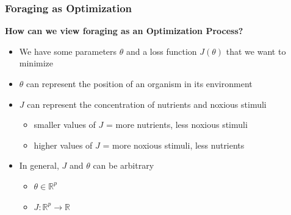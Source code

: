 \documentclass{beamer}
\begin{document}
\begin{frame}
\frametitle{Foraging as Optimization}
\textbf{How can we view foraging as an Optimization Process?}
\begin{itemize}
  \item<1-> We have some parameters $\theta$ and a loss function $J(\theta)$ that we want to minimize
  \item<2-> $\theta$ can represent the position of an organism in its environment
  \item<3-> $J$ can represent the concentration of nutrients and noxious stimuli
  \begin{itemize}
    \item smaller values of $J$ = more nutrients, less noxious stimuli
    \item higher values of $J$ = more noxious stimuli, less nutrients
  \end{itemize}
  \item<4-> In general, $J$ and $\theta$ can be arbitrary
  \begin{itemize}
    \item $\theta \in \mathbb{R}^p$
    \item $J: \mathbb{R}^p \to \mathbb{R}$
  \end{itemize}
\end{itemize}
\end{frame}

\end{document}
